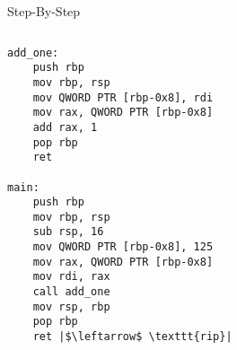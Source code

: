 \documentclass[hyphens,aspectratio=169]{beamer}
\begin{document}
\begin{frame}[fragile]{Step-By-Step}
    \begin{columns}
        \begin{column}{0.33\textwidth}
            \begin{verbatim}
add_one:
    push rbp
    mov rbp, rsp
    mov QWORD PTR [rbp-0x8], rdi
    mov rax, QWORD PTR [rbp-0x8]
    add rax, 1
    pop rbp
    ret

main:
    push rbp
    mov rbp, rsp
    sub rsp, 16
    mov QWORD PTR [rbp-0x8], 125
    mov rax, QWORD PTR [rbp-0x8]
    mov rdi, rax
    call add_one
    mov rsp, rbp
    pop rbp
    ret |$\leftarrow$ \texttt{rip}|
            \end{verbatim}
        \end{column}
        \begin{column}{0.33\textwidth}
\end{column}
\end{columns}
\end{frame}
\end{document}
